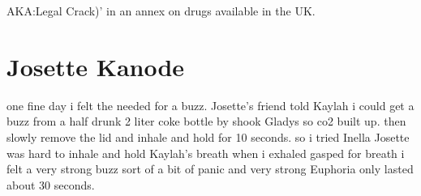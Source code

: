 \documentclass[12pt]{book}
\begin{document}
AKA:Legal Crack)' in an annex on drugs available in the UK.



\chapter{Josette Kanode}

one fine day i felt the needed for a buzz. Josette's friend told Kaylah i could get a buzz from a half drunk 2 liter coke bottle by shook Gladys so co2 built up. then slowly remove the lid and inhale and hold for 10 seconds. so i tried Inella Josette was hard to inhale and hold Kaylah's breath when i exhaled gasped for breath i felt a very strong buzz sort of a bit of panic and very strong Euphoria only lasted about 30 seconds.
\end{document}
